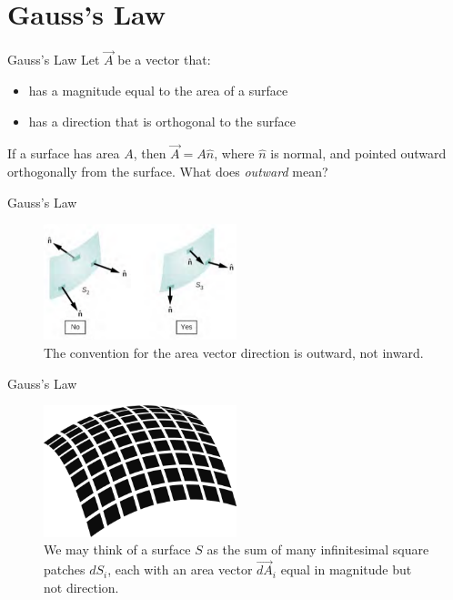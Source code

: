 \documentclass{beamer}
\begin{document}
\section{Gauss's Law}

\begin{frame}{Gauss's Law}
Let $\vec{A}$ be a vector that:
\begin{itemize}
\item has a magnitude equal to the area of a surface
\item has a direction that is orthogonal to the surface
\end{itemize}
If a surface has area $A$, then $\vec{A} = A \hat{n}$, where $\hat{n}$ is normal, and pointed outward orthogonally from the surface.  What does \textit{outward} mean?
\end{frame}

\begin{frame}{Gauss's Law}
\begin{figure}
\centering
\includegraphics[width=0.5\textwidth]{figures/areaVector.png}
\caption{\label{fig:n} The convention for the area vector direction is outward, not inward.}
\end{figure}
\end{frame}

\begin{frame}{Gauss's Law}
\begin{figure}
\centering
\includegraphics[width=0.5\textwidth]{figures/patch.png}
\caption{\label{fig:patch} We may think of a surface $S$ as the sum of many infinitesimal square patches $dS_i$, each with an area vector $\vec{dA}_i$ equal in magnitude but not direction.}
\end{figure}
\end{frame}
\end{document}
